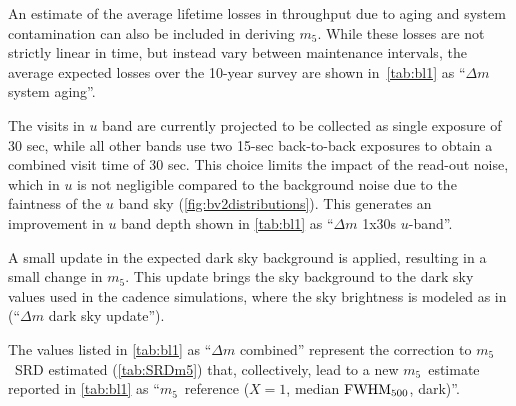 \documentclass[PST,authoryear,toc]{lsstdoc}
\newcommand{\cm}{\ensuremath{C_m}}
\newcommand{\mf}{\ensuremath{m_5}}
\begin{document}
An estimate of the average lifetime losses in throughput due to aging and system contamination can also be included in deriving \mf. While these losses are not strictly linear in time, but instead vary between maintenance intervals, the average expected losses over the 10-year survey are shown in~\autoref{tab:bl1}  as ``$\Delta m$ system aging''.



The visits in $u$ band are currently projected to be collected as single exposure of 30 sec, while all other bands use two 15-sec back-to-back exposures to obtain a combined visit time of 30 sec. This choice limits the impact of the read-out noise, which in $u$ is not negligible compared to the background noise due to the faintness of the $u$ band sky (\autoref{fig:bv2distributions}). %
This generates an improvement in $u$ band depth  shown in \autoref{tab:bl1} as  ``$\Delta m$ 1x30s $u$-band''.

A small update in the expected dark sky background is applied, resulting in a small change in \mf. This update brings the sky background to the dark sky values used in the cadence simulations, where the sky brightness is modeled as in \href{https://www.osti.gov/biblio/1784946}{{\citet{osti_1784946}}} (``$\Delta m$ dark sky update''). 

The values listed in \autoref{tab:bl1} as ``$\Delta m$ combined'' represent the correction to \mf \ SRD estimated (\autoref{tab:SRDm5}) that, collectively, lead to a new \mf\ estimate reported in \autoref{tab:bl1} as ``\mf\ reference ($X=1$, median ${\rm FWHM}_{500}$, dark)''. 


\FloatBarrier
\end{document}
